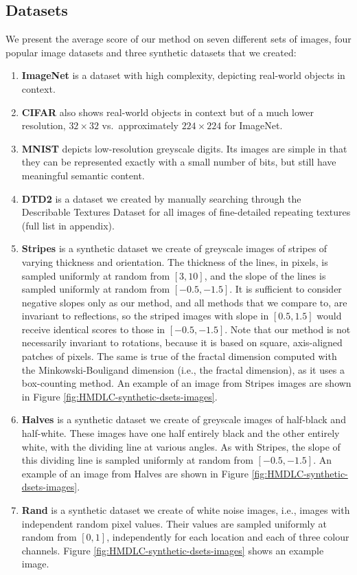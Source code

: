 \documentclass[a4paper,fleqn]{cas-sc}
\theoremstyle{remark}
\begin{document}
\subsection{Datasets}
We present the average score of our method on seven different sets of images, four popular image datasets and three synthetic datasets that we created: 
\begin{enumerate}
\item \textbf{ImageNet} is a dataset with high complexity, depicting real-world objects in context. 
\item \textbf{CIFAR} also shows real-world objects in context but of a much lower resolution, $32 \times 32$ vs.~approximately $224 \times 224$ for ImageNet. 
\item \textbf{MNIST} depicts low-resolution greyscale digits. Its images are simple in that they can be represented exactly with a small number of bits, but still have meaningful semantic content. 
\item \textbf{DTD2} is a dataset we created by manually searching through the Describable Textures Dataset \parencite{cimpoi2014describing} for all images of fine-detailed repeating textures (full list in appendix). 
\item \textbf{Stripes} is a synthetic dataset we create of greyscale images of stripes of varying thickness and orientation. The thickness of the lines, in pixels, is sampled uniformly at random from $[3,10]$, and the slope of the lines is sampled uniformly at random from $[-0.5, -1.5]$. It is sufficient to consider negative slopes only as our method, and all methods that we compare to, are invariant to reflections, so the striped images with slope in $[0.5, 1.5]$ would receive identical scores to those in $[-0.5, -1.5]$. Note that our method is not necessarily invariant to rotations, because it is based on square, axis-aligned patches of pixels. The same is true of the fractal dimension computed with the Minkowski-Bouligand dimension (i.e., the fractal dimension), as it uses a box-counting method. An example of an image from Stripes images are shown in Figure \ref{fig:HMDLC-synthetic-dsets-images}.
\\
\item \textbf{Halves} is a synthetic dataset we create of greyscale images of half-black and half-white. These images have one half entirely black and the other entirely white, with the dividing line at various angles. As with Stripes, the slope of this dividing line is sampled uniformly at random from $[-0.5, -1.5]$. An example of an image from Halves are shown in Figure \ref{fig:HMDLC-synthetic-dsets-images}.
\\
\item \textbf{Rand} is a synthetic dataset we create of white noise images, i.e., images with independent random pixel values. Their values are sampled uniformly at random from $[0,1]$, independently for each location and each of three colour channels. Figure \ref{fig:HMDLC-synthetic-dsets-images} shows an example image.
\\
\end{enumerate}
\end{document}
